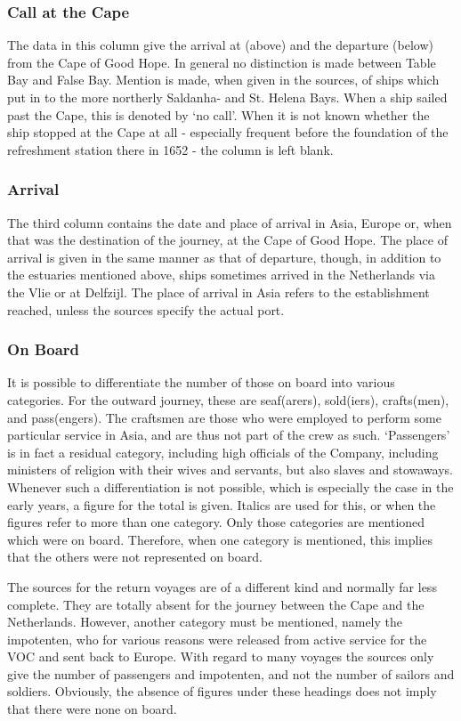 \documentclass[10pt,twocolumn,fleqn]{article}
\begin{document}
\subsubsection*{Call at the Cape}
The data in this column give the arrival at (above) and the departure (below) 
from the Cape of Good Hope. In general no distinction is made between Table 
Bay and False Bay. Mention is made, when given in the sources, of ships 
which put in to the more northerly Saldanha- and St. Helena Bays. When a 
ship sailed past the Cape, this is denoted by `no call'. When it is not 
known whether the ship stopped at the Cape at all - especially frequent before 
the foundation of the refreshment station there in 1652 - the column is 
left blank.

\subsubsection*{Arrival}
The third column contains the date and place of arrival in Asia, Europe or, 
when that was the destination of the journey, at the Cape of Good Hope. 
The place of arrival is given in the same manner as that of departure, though,
in addition to the estuaries mentioned above, ships sometimes arrived in the 
Netherlands via the Vlie or at Delfzijl. The place of arrival in Asia 
refers to the establishment reached, unless the sources specify the actual port.

\subsubsection*{On Board}
It is possible to differentiate the number of those on board into various 
categories. For the outward journey, these are seaf(arers), sold(iers), 
crafts(men), and pass(engers). The craftsmen are those who were employed to 
perform some particular service in Asia, and are thus not part of the crew 
as such. `Passengers' is in fact a residual category, including high officials 
of the Company, including ministers of religion with their wives and servants, 
but also slaves and stowaways. Whenever such a differentiation is not possible,
which is especially the case in the early years, a figure for the total is 
given. Italics are used for this, or when the figures refer to more than 
one category. Only those categories are mentioned which were on board.
Therefore, when one category is mentioned, this implies that the others 
were not represented on board.

The sources for the return voyages are of a different kind and normally far 
less complete. They are totally absent for the journey between the Cape and 
the Netherlands. However, another category must be mentioned, namely 
the impotenten, who for various reasons were released from active service 
for the VOC and sent back to Europe. With regard to many voyages the sources 
only give the number of passengers and impotenten, and not the number of 
sailors and soldiers. Obviously, the absence of figures under these 
headings does not imply that there were none on board.
\end{document}
